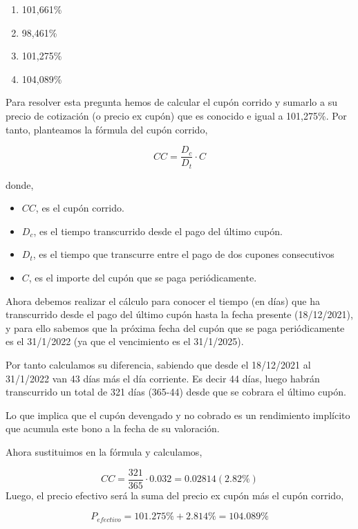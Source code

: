 \documentclass[
  letterpaper,
  DIV=11,
  numbers=noendperiod]{scrartcl}
\begin{document}
\begin{enumerate}
\def\labelenumi{\alph{enumi}.}
\item
  101,661\%
\item
  98,461\%
\item
  101,275\%
\item
  104,089\%
\end{enumerate}

\begin{tcolorbox}[enhanced jigsaw, colframe=quarto-callout-note-color-frame, opacityback=0, colback=white, leftrule=.75mm, left=2mm, breakable, arc=.35mm, rightrule=.15mm, toprule=.15mm, bottomrule=.15mm]
\begin{minipage}[t]{5.5mm}
\textcolor{quarto-callout-note-color}{\faInfo}
\end{minipage}%
\begin{minipage}[t]{\textwidth - 5.5mm}

Para resolver esta pregunta hemos de calcular el cupón corrido y sumarlo
a su precio de cotización (o precio ex cupón) que es conocido e igual a
101,275\%. Por tanto, planteamos la fórmula del cupón corrido,

\[CC=\frac{D_c}{D_t}\cdot C\]

donde,

\begin{itemize}
\item
  \(CC\), es el cupón corrido.
\item
  \(D_{c}\), es el tiempo transcurrido desde el pago del último cupón.
\item
  \(D_{t}\), es el tiempo que transcurre entre el pago de dos cupones
  consecutivos
\item
  \(C\), es el importe del cupón que se paga periódicamente.
\end{itemize}

Ahora debemos realizar el cálculo para conocer el tiempo (en días) que
ha transcurrido desde el pago del último cupón hasta la fecha presente
(18/12/2021), y para ello sabemos que la próxima fecha del cupón que se
paga periódicamente es el 31/1/2022 (ya que el vencimiento es el
31/1/2025).

Por tanto calculamos su diferencia, sabiendo que desde el 18/12/2021 al
31/1/2022 van 43 días más el día corriente. Es decir 44 días, luego
habrán transcurrido un total de 321 días (365-44) desde que se cobrara
el último cupón.

Lo que implica que el cupón devengado y no cobrado es un rendimiento
implícito que acumula este bono a la fecha de su valoración.

Ahora sustituimos en la fórmula y calculamos,

\[CC=\frac{321}{365}\cdot 0.032=0.02814(2.82\%)\] Luego, el precio
efectivo será la suma del precio ex cupón más el cupón corrido,

\[P_{efectivo}=101.275\%+2.814\%=104.089\%\]

\end{minipage}%
\end{tcolorbox}
\end{document}
